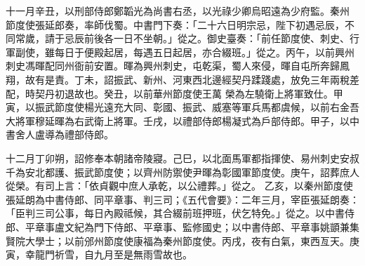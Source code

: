 \begin{pinyinscope}
 十一月辛丑，以刑部侍郎鄭韜光為尚書右丞，以光祿少卿烏昭遠為少府監。秦州
 節度使張延郎奏，率師伐蜀。中書門下奏：「二十六日明宗忌，陛下初遇忌辰，不同常歲，請于忌辰前後各一日不坐朝。」從之。御史臺奏：「前任節度使、刺史、行軍副使，雖每日于便殿起居，每遇五日起居，亦合綴班。」從之。丙午，以前興州刺史馮暉配同州衙前安置。暉為興州刺史，屯乾渠，蜀人來侵，暉自屯所奔歸鳳翔，故有是責。丁未，詔振武、新州、河東西北邊經契丹蹂踐處，放免三年兩稅差配，時契丹初退故也。癸丑，以前華州節度使王萬
 榮為左驍衛上將軍致仕。甲寅，以振武節度使楊光遠充大同、彰國、振武、威塞等軍兵馬都虞候，以前右金吾大將軍穆延暉為右武衛上將軍。壬戌，以禮部侍郎楊凝式為戶部侍郎。甲子，以中書舍人盧導為禮部侍郎。



 十二月丁卯朔，詔修奉本朝諸帝陵寢。己巳，以北面馬軍都指揮使、易州刺史安叔千為安北都護、振武節度使；以齊州防禦使尹暉為彰國軍節度使。庚午，詔葬庶人從榮。有司上言：「依貞觀中庶人承乾，以公禮葬。」從之。
 乙亥，以秦州節度使張延朗為中書侍郎、同平章事、判三司；《五代會要》：二年三月，宰臣張延朗奏：「臣判三司公事，每日內殿祗候，其合綴前班押班，伏乞特免。」從之。以中書侍郎、平章事盧文紀為門下侍郎、平章事、監修國史；以中書侍郎、平章事姚顗兼集賢院大學士；以前邠州節度使康福為秦州節度使。丙戌，夜有白氣，東西亙天。庚寅，幸龍門祈雪，自九月至是無雨雪故也。



\end{pinyinscope}